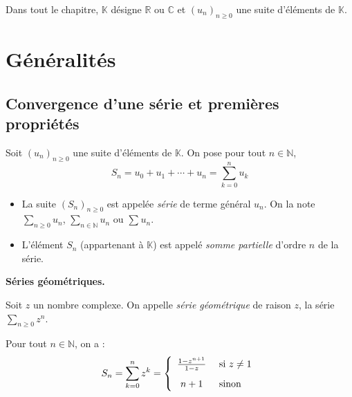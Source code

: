 \documentclass[french,11pt,twoside]{VcCours}
\newcommand{\Sum}[2]{\ensuremath{\textstyle{\sum\limits_{#1}^{#2}}}}
\begin{document}

\tableofcontents
\separationTitre

\newpage
Dans tout le chapitre, $\mathbb{K}$ désigne $\mathbb{R}$ ou $\mathbb{C}$ et $(u_n)_{n \geq 0}$ une suite d'éléments de $\mathbb{K}$.

\section{Généralités}
\subsection{Convergence d'une série et premières propriétés}
\begin{Definition}{}
Soit $(u_n)_{n \geq 0}$ une suite d'éléments de $\mathbb{K}$. On pose pour tout $n \in \mathbb{N}$,
$$ S_n =  u_0 + u_1 + \cdots + u_n = \sum_{k=0}^n u_k $$

\begin{itemize}
\item La suite $(S_n)_{n \geq 0}$ est appelée \emph{série} de terme général $u_n$. On la note $\Sum{n \geq 0}{} u_n$, $\Sum{n \in \mathbb{N}}{} u_n$ ou $\Sum{}{} u_n$.
\item L'élément $S_n$ (appartenant à $\mathbb{K}$) est appelé \emph{somme partielle} d'ordre $n$ de la série.
\end{itemize}
\end{Definition}

\begin{Exemple} \textbf{Séries géométriques.}


Soit $z$ un nombre complexe. On appelle \emph{série géométrique} de raison $z$, la série $\Sum{n \geq 0}{} z^n$. 

Pour tout $n \in \mathbb{N}$, on a :
$$ S_n = \sum_{k=0}^n z^k = \left\lbrace \begin{array}{cl}
\frac{1-z^{n+1}}{1-z} & \hbox{ si }  z \neq 1 \\[0.3cm]
n + 1 & \hbox{ sinon} \\
\end{array}\right.$$


\end{Exemple}
\end{document}
